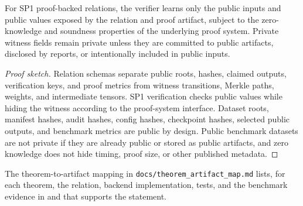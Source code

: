 \begin{theorem}
\label{thm:privacy-boundary}
For SP1 proof-backed relations, the verifier learns only the public inputs and
public values exposed by the relation and proof artifact, subject to the
zero-knowledge and soundness properties of the underlying proof system.
Private witness fields remain private unless they are committed to public
artifacts, disclosed by reports, or intentionally included in public inputs.
\end{theorem}
\begin{proof}[Proof sketch]
Relation schemas separate public roots, hashes, claimed outputs, verification
keys, and proof metrics from witness transitions, Merkle paths, weights, and
intermediate tensors.  SP1 verification checks public values while hiding the
witness according to the proof-system interface.  Dataset roots, manifest
hashes, audit hashes, config hashes, checkpoint hashes, selected public
outputs, and benchmark metrics are public by design.  Public benchmark datasets
are not private if they are already public or stored as public artifacts, and
zero knowledge does not hide timing, proof size, or other published metadata.
\end{proof}

The theorem-to-artifact mapping in \texttt{docs/theorem\_artifact\_map.md}
lists, for each theorem, the relation, backend implementation, tests, and the
benchmark evidence in  and  that
supports the statement.

